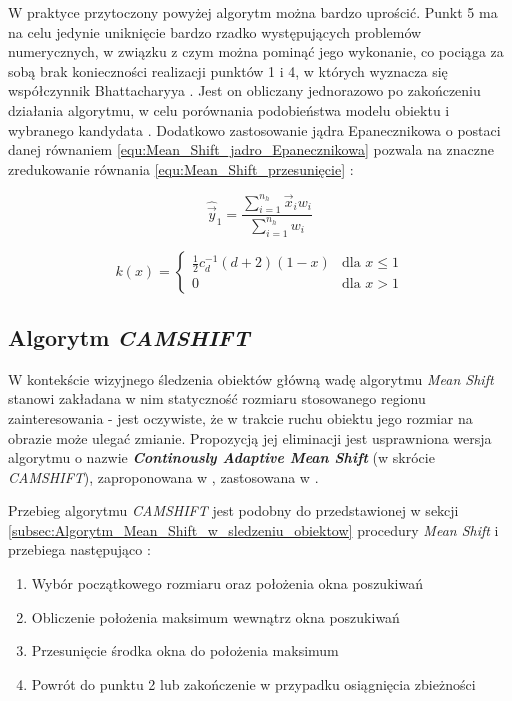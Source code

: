 W praktyce przytoczony powyżej algorytm można bardzo uprościć. Punkt 5 ma na celu jedynie uniknięcie bardzo rzadko występujących problemów numerycznych, w związku z czym można pominąć jego wykonanie, co pociąga za sobą brak konieczności realizacji punktów 1 i 4, w których wyznacza się współczynnik Bhattacharyya \cite{Comaniciu2003}. Jest on obliczany jednorazowo po zakończeniu działania algorytmu, w celu porównania podobieństwa modelu obiektu i wybranego kandydata \cite{Comaniciu2003}. Dodatkowo zastosowanie jądra Epanecznikowa o postaci danej równaniem \ref{equ:Mean_Shift_jadro_Epanecznikowa} pozwala na znaczne zredukowanie równania \ref{equ:Mean_Shift_przesunięcie} \cite{Comaniciu2003}:

\begin{equation}
\label{equ:Mean_Shift_przesunięcie_zredukowane}
	\hat{\vec{y}}_1 = \frac{\sum_{i=1}^{n_h}\vec{x}_i w_i}{\sum_{i=1}^{n_h} w_i}
\end{equation}

\begin{equation}
\label{equ:Mean_Shift_jadro_Epanecznikowa}
	k(x) = 
	\begin{cases}
		\frac{1}{2}c_d^{-1}(d+2)(1-x) & \text{dla } x \leq 1 \\
		0 & \text{dla } x > 1
	\end{cases}
\end{equation}

\subsection{Algorytm \textit{CAMSHIFT}}
\label{subsec:Algorytm_CAMSHIFT}

W kontekście wizyjnego śledzenia obiektów główną wadę algorytmu \textit{Mean Shift} stanowi zakładana w nim statyczność rozmiaru stosowanego regionu zainteresowania - jest oczywiste, że w trakcie ruchu obiektu jego rozmiar na obrazie może ulegać zmianie. Propozycją jej eliminacji jest usprawniona wersja algorytmu o nazwie \textbf{\textit{Continously Adaptive Mean Shift}} (w skrócie \textit{CAMSHIFT}), zaproponowana w \cite{Bradski1998}, zastosowana w \cite{Zhang2011}.

Przebieg algorytmu \textit{CAMSHIFT} jest podobny do przedstawionej w sekcji \ref{subsec:Algorytm_Mean_Shift_w_sledzeniu_obiektow} procedury \textit{Mean Shift} i przebiega następująco \cite{Bradski1998}:

\begin{enumerate}
	\item Wybór początkowego rozmiaru oraz położenia okna poszukiwań
	\item Obliczenie położenia maksimum wewnątrz okna poszukiwań
	\item Przesunięcie środka okna do położenia maksimum
	\item Powrót do punktu 2 lub zakończenie w przypadku osiągnięcia zbieżności
\end{enumerate}

